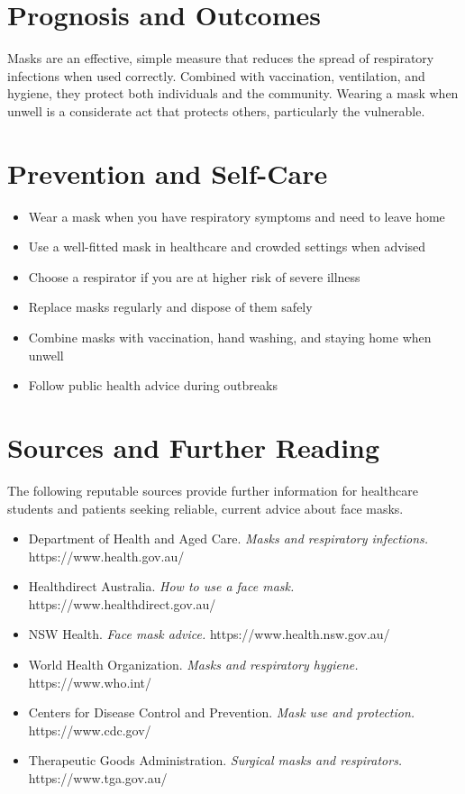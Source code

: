 \section*{Prognosis and Outcomes}
Masks are an effective, simple measure that reduces the spread of respiratory infections when used correctly. Combined with vaccination, ventilation, and hygiene, they protect both individuals and the community. Wearing a mask when unwell is a considerate act that protects others, particularly the vulnerable.

\section*{Prevention and Self-Care}
\begin{itemize}
    \item Wear a mask when you have respiratory symptoms and need to leave home
    \item Use a well-fitted mask in healthcare and crowded settings when advised
    \item Choose a respirator if you are at higher risk of severe illness
    \item Replace masks regularly and dispose of them safely
    \item Combine masks with vaccination, hand washing, and staying home when unwell
    \item Follow public health advice during outbreaks
\end{itemize}

\section*{Sources and Further Reading}
The following reputable sources provide further information for healthcare students and patients seeking reliable, current advice about face masks.
\begin{itemize}
    \item Department of Health and Aged Care. \textit{Masks and respiratory infections.} https://www.health.gov.au/
    \item Healthdirect Australia. \textit{How to use a face mask.} https://www.healthdirect.gov.au/
    \item NSW Health. \textit{Face mask advice.} https://www.health.nsw.gov.au/
    \item World Health Organization. \textit{Masks and respiratory hygiene.} https://www.who.int/
    \item Centers for Disease Control and Prevention. \textit{Mask use and protection.} https://www.cdc.gov/
    \item Therapeutic Goods Administration. \textit{Surgical masks and respirators.} https://www.tga.gov.au/
\end{itemize}
